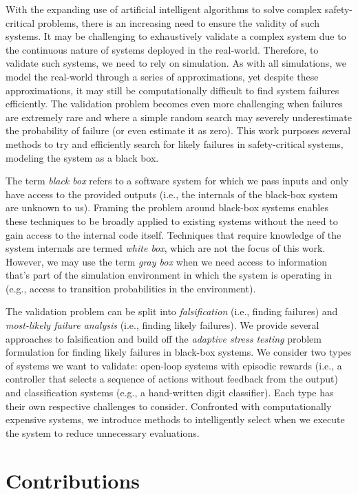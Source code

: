 With the expanding use of artificial intelligent algorithms to solve complex safety-critical problems, there is an increasing need to ensure the validity of such systems.
It may be challenging to exhaustively validate a complex system due to the continuous nature of systems deployed in the real-world.
Therefore, to validate such systems, we need to rely on simulation.
As with all simulations, we model the real-world through a series of approximations, yet despite these approximations, it may still be computationally difficult to find system failures efficiently.
The validation problem becomes even more challenging when failures are extremely rare and where a simple random search may severely underestimate the probability of failure (or even estimate it as zero).
This work purposes several methods to try and efficiently search for likely failures in safety-critical systems, modeling the system as a black box.


The term \textit{black box} refers to a software system for which we pass inputs and only have access to the provided outputs (i.e., the internals of the black-box system are unknown to us).
Framing the problem around black-box systems enables these techniques to be broadly applied to existing systems without the need to gain access to the internal code itself. 
Techniques that require knowledge of the system internals are termed \textit{white box}, which are not the focus of this work. 
However, we may use the term \textit{gray box} when we need access to information that's part of the simulation environment in which the system is operating in (e.g., access to transition probabilities in the environment).

The validation problem can be split into \textit{falsification} (i.e., finding failures) and \textit{most-likely failure analysis} (i.e., finding likely failures). 
We provide several approaches to falsification and build off the \textit{adaptive stress testing} \cite{lee2020adaptive} problem formulation for finding likely failures in black-box systems.
We consider two types of systems we want to validate: open-loop systems with episodic rewards (i.e., a controller that selects a sequence of actions without feedback from the output) and classification systems (e.g., a hand-written digit classifier).
Each type has their own respective challenges to consider.
Confronted with computationally expensive systems, we introduce methods to intelligently select when we execute the system to reduce unnecessary evaluations.


\section{Contributions}\label{sec:contributions}

